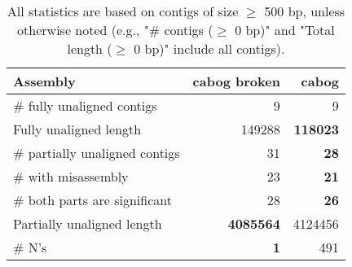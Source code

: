\documentclass[12pt,a4paper]{article}
\begin{document}
\begin{table}[ht]
\begin{center}
\caption{All statistics are based on contigs of size $\geq$ 500 bp, unless otherwise noted (e.g., "\# contigs ($\geq$ 0 bp)" and "Total length ($\geq$ 0 bp)" include all contigs).}
\begin{tabular}{|l*{2}{|r}|}
\hline
Assembly & cabog broken & cabog \\ \hline
\# fully unaligned contigs & 9 & 9 \\ \hline
Fully unaligned length & 149288 & {\bf 118023} \\ \hline
\# partially unaligned contigs & 31 & {\bf 28} \\ \hline
\hspace{5mm}\# with misassembly & 23 & {\bf 21} \\ \hline
\hspace{5mm}\# both parts are significant & 28 & {\bf 26} \\ \hline
Partially unaligned length & {\bf 4085564} & 4124456 \\ \hline
\# N's & {\bf 1} & 491 \\ \hline
\end{tabular}
\end{center}
\end{table}
\end{document}
